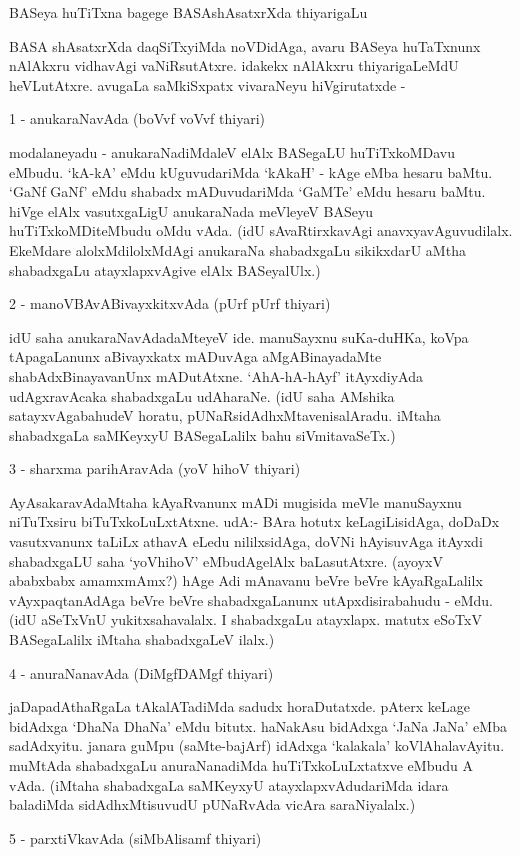 BASeya huTiTxna bagege BASAshAsatxrXda thiyarigaLu

BASA shAsatxrXda daqSiTxyiMda noVDidAga, avaru BASeya huTaTxnunx nAlAkxru vidhavAgi vaNiRsutAtxre. idakekx nAlAkxru thiyarigaLeMdU heVLutAtxre. avugaLa saMkiSxpatx vivaraNeyu hiVgirutatxde -

1 - anukaraNavAda (boVvf voVvf thiyari)

modalaneyadu - anukaraNadiMdaleV elAlx BASegaLU huTiTxkoMDavu eMbudu. `kA-kA' eMdu kUguvudariMda `kAkaH' - kAge eMba hesaru baMtu. `GaNf GaNf' eMdu shabadx mADuvudariMda `GaMTe' eMdu hesaru baMtu. hiVge elAlx vasutxgaLigU anukaraNada meVleyeV BASeyu huTiTxkoMDiteMbudu oMdu vAda. (idU sAvaRtirxkavAgi anavxyavAguvudilalx. EkeMdare alolxMdilolxMdAgi anukaraNa shabadxgaLu sikikxdarU aMtha shabadxgaLu atayxlapxvAgive elAlx BASeyalUlx.)

2 - manoVBAvABivayxkitxvAda (pUrf pUrf thiyari)

idU saha anukaraNavAdadaMteyeV ide. manuSayxnu suKa-duHKa, koVpa tApagaLanunx aBivayxkatx mADuvAga aMgABinayadaMte shabAdxBinayavanUnx mADutAtxne. `AhA-hA-hAyf' itAyxdiyAda udAgxravAcaka shabadxgaLu udAharaNe. (idU saha AMshika satayxvAgabahudeV horatu, pUNaRsidAdhxMtavenisalAradu. iMtaha shabadxgaLa saMKeyxyU BASegaLalilx bahu siVmitavaSeTx.)

3 - sharxma parihAravAda (yoV hihoV thiyari)

AyAsakaravAdaMtaha kAyaRvanunx mADi mugisida meVle manuSayxnu niTuTxsiru biTuTxkoLuLxtAtxne. udA:- BAra hotutx keLagiLisidAga, doDaDx vasutxvanunx taLiLx athavA eLedu nililxsidAga, doVNi hAyisuvAga itAyxdi shabadxgaLU saha `yoVhihoV' eMbudAgelAlx baLasutAtxre. (ayoyxV ababxbabx amamxmAmx?) hAge Adi mAnavanu beVre beVre kAyaRgaLalilx vAyxpaqtanAdAga beVre beVre shabadxgaLanunx utApxdisirabahudu - eMdu. (idU aSeTxVnU yukitxsahavalalx. I shabadxgaLu atayxlapx. matutx eSoTxV BASegaLalilx iMtaha shabadxgaLeV ilalx.)

4 - anuraNanavAda (DiMgfDAMgf thiyari)

jaDapadAthaRgaLa tAkalATadiMda sadudx horaDutatxde. pAterx keLage bidAdxga `DhaNa DhaNa' eMdu bitutx. haNakAsu bidAdxga `JaNa JaNa' eMba sadAdxyitu. janara guMpu (saMte-bajArf) idAdxga `kalakala' koVlAhalavAyitu. muMtAda shabadxgaLu anuraNanadiMda huTiTxkoLuLxtatxve eMbudu A vAda. (iMtaha shabadxgaLa saMKeyxyU atayxlapxvAdudariMda idara baladiMda sidAdhxMtisuvudU pUNaRvAda vicAra saraNiyalalx.)

5 - parxtiVkavAda (siMbAlisamf thiyari)

